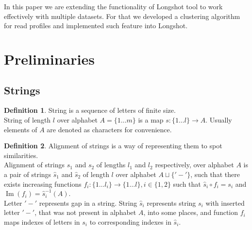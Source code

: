 \documentclass[a4paper, 12pt]{article}
\DeclareMathOperator{\Image}{Im}
\theoremstyle{definition}
\newtheorem{definition}{Definition}[section]
\theoremstyle{definition}
\theoremstyle{remark}
\begin{document}
In this paper we are extending the functionality of 
Longshot tool to work effectively with multiple datasets. 
For that we developed a clustering algorithm for 
read profiles and implemented such feature into Longshot. 

\section{Preliminaries}
\subsection{Strings}

\begin{definition}
    String is a sequence of letters of finite size. \\
    String of length $l$ over alphabet $A = \{ 1 \ldots m \}$ is a map $s: \{ 1 \ldots l\} \rightarrow A$.
    Usually elements of $A$ are denoted as characters for convenience.
\end{definition}

\begin{definition}
    Alignment of strings is a way of representing them to spot similarities. \\
    Alignment of strings $s_1$ and $s_2$ of lengths $l_1$ and $l_2$ respectively, 
    over alphabet $A$ is a pair of strings $\hat{s}_1$ and $\hat{s}_2$ 
    of length $l$ over alphabet $A \sqcup \{ '-' \}$, 
    such that there exists increasing functions $f_i: \{1 \ldots l_i \} \rightarrow \{ 1 \ldots l\}, i \in \{1, 2\}$ 
    such that $\hat{s}_i \circ f_i = s_i$ and $\Image (f_i) = \hat{s}_i^{-1}(A)$. \\

    Letter $'-'$ represents gap in a string. 
    String $\hat{s}_i$ represents string $s_i$ with inserted letter $'-'$, 
    that was not present in alphabet $A$, into some places, 
    and function $f_i$ maps indexes of letters in $s_i$ to corresponding indexes in $\hat{s}_i$.
\end{definition}
\end{document}
